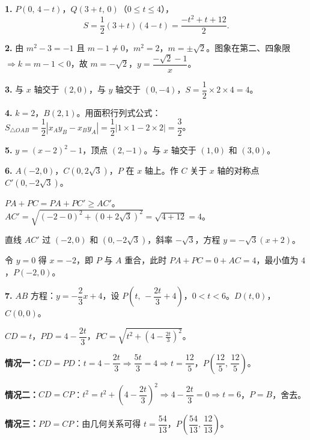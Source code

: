 \documentclass[12pt, a4paper]{ctexart}
\begin{document}
\begin{knowledgebox}[综合练习参考答案]

\textbf{1.} $P(0,\,4-t)$，$Q(3+t,\,0)$（$0\le t\le 4$），
\[S=\frac{1}{2}(3+t)(4-t)=\frac{-t^2+t+12}{2}.\]

\medskip

\textbf{2.} 由 $m^2-3=-1$ 且 $m-1\ne 0$，$m^2=2$，$m=\pm\sqrt{2}$。图象在第二、四象限 $\Rightarrow k=m-1<0$，故 $m=-\sqrt{2}$，$y=\dfrac{-\sqrt{2}-1}{x}$。

\medskip

\textbf{3.} 与 $x$ 轴交于 $(2,0)$，与 $y$ 轴交于 $(0,-4)$，$S=\dfrac{1}{2}\times 2\times 4=\boxed{4}$。

\medskip

\textbf{4.} $k=2$，$B(2,1)$。用面积行列式公式：
$S_{\triangle OAB}=\dfrac{1}{2}|x_A y_B-x_B y_A|=\dfrac{1}{2}|1\times 1-2\times 2|=\boxed{\dfrac{3}{2}}$。

\medskip

\textbf{5.} $y=(x-2)^2-1$，顶点 $\boxed{(2,-1)}$。与 $x$ 轴交于 $\boxed{(1,0)\text{ 和 }(3,0)}$。

\medskip

\textbf{6.} $A(-2,0)$，$C(0,2\sqrt{3})$，$P$ 在 $x$ 轴上。作 $C$ 关于 $x$ 轴的对称点 $C'(0,-2\sqrt{3})$。

$PA+PC=PA+PC'\ge AC'$。$AC'=\sqrt{(-2-0)^2+(0+2\sqrt{3})^2}=\sqrt{4+12}=4$。

直线 $AC'$ 过 $(-2,0)$ 和 $(0,-2\sqrt{3})$，斜率 $-\sqrt{3}$，方程 $y=-\sqrt{3}(x+2)$。

令 $y=0$ 得 $x=-2$，即 $P$ 与 $A$ 重合，此时 $PA+PC=0+AC=4$，最小值为 $\boxed{4}$，$P(-2,0)$。

\medskip

\textbf{7.} $AB$ 方程：$y=-\dfrac{2}{3}x+4$，设 $P\!\left(t,\,-\dfrac{2t}{3}+4\right)$，$0<t<6$。$D(t,0)$，$C(0,0)$。

$CD=t$，$PD=4-\dfrac{2t}{3}$，$PC=\sqrt{t^2+\left(4-\frac{2t}{3}\right)^2}$。

\textbf{情况一：}$CD=PD$：$t=4-\dfrac{2t}{3}\Rightarrow\dfrac{5t}{3}=4\Rightarrow t=\dfrac{12}{5}$，$P\!\left(\dfrac{12}{5},\,\dfrac{12}{5}\right)$。

\textbf{情况二：}$CD=CP$：$t^2=t^2+\left(4-\dfrac{2t}{3}\right)^2\Rightarrow 4-\dfrac{2t}{3}=0\Rightarrow t=6$，$P=B$，舍去。

\textbf{情况三：}$PD=CP$：由几何关系可得 $t=\dfrac{54}{13}$，$P\!\left(\dfrac{54}{13},\,\dfrac{12}{13}\right)$。

\medskip


\end{knowledgebox}
\end{document}

